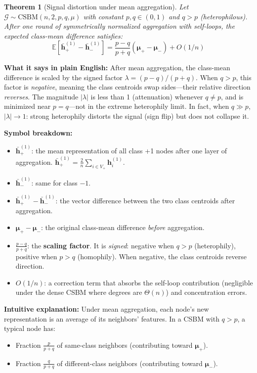 \documentclass[11pt,a4paper]{article}
\newcommand{\E}{\mathbb{E}}
\newcommand{\G}{\mathcal{G}}
\newcommand{\bh}{\mathbf{h}}
\theoremstyle{definition}
\theoremstyle{plain}
\newtheorem{theorem}{Theorem}[section]
\begin{document}
\begin{theorem}[Signal distortion under mean aggregation]
Let $\G \sim \mathrm{CSBM}(n, 2, p, q, \mu)$ with constant $p, q \in (0,1)$ and $q > p$ (heterophilous).
After one round of symmetrically normalized aggregation with self-loops, the expected class-mean difference satisfies:
\begin{equation}
  \E[\bar{\bh}_+^{(1)} - \bar{\bh}_-^{(1)}]
  = \frac{p - q}{p + q}(\boldsymbol{\mu}_+ - \boldsymbol{\mu}_-) + O(1/n)
  \tag{Eq.~9, Thm.~1}
\end{equation}
\end{theorem}

\textbf{What it says in plain English:}
After mean aggregation, the class-mean difference is scaled by the signed factor $\lambda = (p-q)/(p+q)$.
When $q > p$, this factor is \emph{negative}, meaning the class centroids swap sides---their relative direction \emph{reverses}.
The magnitude $|\lambda|$ is less than 1 (attenuation) whenever $q \neq p$, and is minimized near $p = q$---not in the extreme heterophily limit.
In fact, when $q \gg p$, $|\lambda| \to 1$: strong heterophily distorts the signal (sign flip) but does not collapse it.

\textbf{Symbol breakdown:}
\begin{itemize}
  \item $\bar{\bh}_+^{(1)}$: the mean representation of all class +1 nodes
    after one layer of aggregation.
    $\bar{\bh}_+^{(1)} = \frac{2}{n}\sum_{i \in V_+} \bh_i^{(1)}$.
  \item $\bar{\bh}_-^{(1)}$: same for class $-1$.
  \item $\bar{\bh}_+^{(1)} - \bar{\bh}_-^{(1)}$: the vector difference
    between the two class centroids after aggregation.
  \item $\boldsymbol{\mu}_+ - \boldsymbol{\mu}_-$: the original class-mean
    difference \emph{before} aggregation.
  \item $\frac{p-q}{p+q}$: the \textbf{scaling factor}. It is \emph{signed}:
    negative when $q > p$ (heterophily), positive when $p > q$ (homophily).
    When negative, the class centroids reverse direction.
  \item $O(1/n)$: a correction term that absorbs the self-loop contribution
    (negligible under the dense CSBM where degrees are $\Theta(n)$) and
    concentration errors.
\end{itemize}

\textbf{Intuitive explanation:}
Under mean aggregation, each node's new representation is an average of its
neighbors' features.
In a CSBM with $q > p$, a typical node has:
\begin{itemize}[nosep]
  \item Fraction $\frac{p}{p+q}$ of same-class neighbors (contributing
    toward $\boldsymbol{\mu}_+$).
  \item Fraction $\frac{q}{p+q}$ of different-class neighbors (contributing
    toward $\boldsymbol{\mu}_-$).
\end{itemize}
\end{document}
